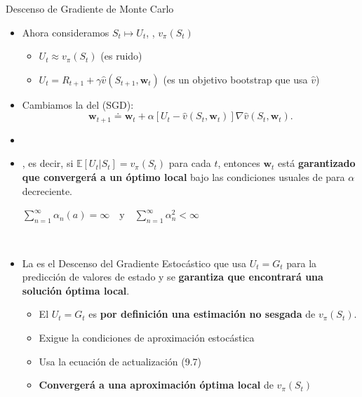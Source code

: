 \documentclass[10pt, envcountsect, handout, aspectratio=1610, hyperref={hypertexnames=true}]{beamer}
\begin{document}
\begin{frame}{Descenso de Gradiente de Monte Carlo}
	\begin{itemize}
		\item Ahora consideramos \(S_t \mapsto U_t\), , \(v_\pi(S_t)\)
			\begin{itemize}
				\item $U_t  \approx v_\pi(S_t) $ (es ruido)
				\item $U_t = R_{t+1} + \gamma \hat{v}(S_{t+1}, \mathbf{w}_t)$ (es  un objetivo bootstrap que usa $\hat{v}$)
			\end{itemize}
			
				
		\item Cambiamos la  del  (SGD):
			\begin{equation}
				\mathbf{w}_{t+1} \doteq \mathbf{w}_t + \alpha \left[ U_t - \hat{v}(S_t, \mathbf{w}_t) \right] \nabla \hat{v}(S_t, \mathbf{w}_t). \tag{9.7}
			\end{equation}
			
		\item[] \vskip-1.15cm
		
		\item {}, es decir, si $\mathbb{E}[U_t | S_t] = v_\pi(S_t)$ para cada $t$, entonces $\mathbf{w}_t$ está \textbf{garantizado que convergerá a un óptimo local} bajo las condiciones usuales de  para $\alpha$ decreciente.
		
		\centerline{$
			\sum_{n=1}^{\infty} \alpha_n(a) = \infty \quad \text{y} \quad \sum_{n=1}^{\infty} \alpha_n^2 < \infty
			$}
			
~

		\item La  es el Descenso del Gradiente Estocástico que usa $U_t=G_t$ para la predicción de valores de estado y se \textbf{garantiza que encontrará una solución óptima local}.
		
			\begin{itemize}
				\item El  $U_t = G_t$ es \textbf{por definición una estimación no sesgada} de $v_\pi(S_t)$.
				\item Exigue la condiciones de aproximación estocástica
				\item Usa la ecuación de actualización (9.7)
				\item \textbf{Convergerá a una aproximación óptima local} de $v_\pi(S_t)$
			\end{itemize}
	\end{itemize}
\end{frame}
\end{document}
